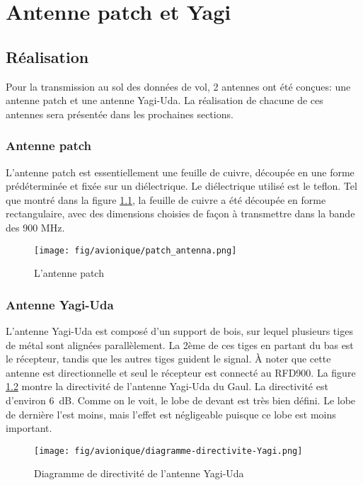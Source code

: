 \chapter{Antenne patch et Yagi}
\label{chap:antennes}

\section{Réalisation}

Pour la transmission au sol des données de vol, 2 antennes ont été conçues: une
antenne patch et une antenne Yagi-Uda. La réalisation de chacune de ces
antennes sera présentée dans les prochaines sections.

\subsection{Antenne patch}

L'antenne patch est essentiellement une feuille de cuivre, découpée en une
forme prédéterminée et fixée sur un diélectrique. Le diélectrique utilisé est
le teflon. Tel que montré dans la figure \ref{f:antenne_patch}, la feuille de
cuivre a été découpée en forme rectangulaire, avec des dimensions choisies de
façon à transmettre dans la bande des 900 MHz.

\begin{figure}[H]
	\center
	\texttt{[image: fig/avionique/patch\_antenna.png]}
	\caption{L'antenne patch}
	\label{f:antenne_patch}
\end{figure}

\subsection{Antenne Yagi-Uda}

L'antenne Yagi-Uda est composé d'un support de bois, sur lequel plusieurs tiges
de métal sont alignées parallèlement. La 2ème de ces tiges en partant du bas
est le récepteur, tandis que les autres tiges guident le signal. À noter que
cette antenne est directionnelle et seul le récepteur est connecté au RFD900.
La figure \ref{f:diagramme_directivite_yagi} montre la directivité de l'antenne
Yagi-Uda du Gaul. La directivité est d'environ 6~dB. Comme on le voit, le lobe
de devant est très bien défini. Le lobe de dernière l'est moins, mais l'effet
est négligeable puisque ce lobe est moins important.

\begin{figure}[H]
	\center
	\texttt{[image: fig/avionique/diagramme-directivite-Yagi.png]}
	\caption{Diagramme de directivité de l'antenne Yagi-Uda}
	\label{f:diagramme_directivite_yagi}
\end{figure}

